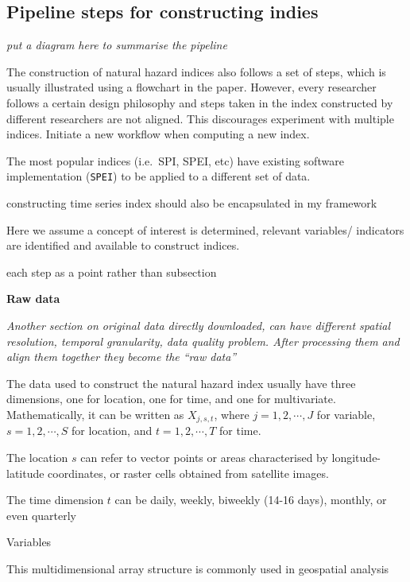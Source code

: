 \documentclass[
]{article}
\begin{document}
\hypertarget{pipeline-steps-for-constructing-indies}{%
\subsection{Pipeline steps for constructing
indies}\label{pipeline-steps-for-constructing-indies}}

\emph{put a diagram here to summarise the pipeline}

The construction of natural hazard indices also follows a set of steps,
which is usually illustrated using a flowchart in the paper. However,
every researcher follows a certain design philosophy and steps taken in
the index constructed by different researchers are not aligned. This
discourages experiment with multiple indices. Initiate a new workflow
when computing a new index.

The most popular indices (i.e.~SPI, SPEI, etc) have existing software
implementation (\texttt{SPEI}) to be applied to a different set of data.

constructing time series index should also be encapsulated in my
framework

Here we assume a concept of interest is determined, relevant variables/
indicators are identified and available to construct indices.

each step as a point rather than subsection

\textbf{Raw data}

\emph{Another section on original data directly downloaded, can have
different spatial resolution, temporal granularity, data quality
problem. After processing them and align them together they become the
``raw data''}

The data used to construct the natural hazard index usually have three
dimensions, one for location, one for time, and one for multivariate.
Mathematically, it can be written as \(X_{j, s, t}\), where
\(j = 1, 2, \cdots, J\) for variable, \(s = 1, 2, \cdots, S\) for
location, and \(t = 1, 2, \cdots, T\) for time.

The location \(s\) can refer to vector points or areas characterised by
longitude-latitude coordinates, or raster cells obtained from satellite
images.

The time dimension \(t\) can be daily, weekly, biweekly (14-16 days),
monthly, or even quarterly

Variables

This multidimensional array structure is commonly used in geospatial
analysis
\end{document}
